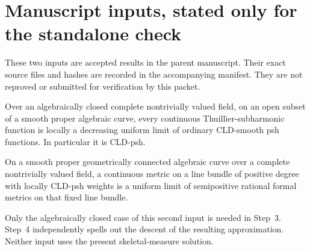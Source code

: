 \section*{Manuscript inputs, stated only for the standalone check}
These two inputs are accepted results in the parent manuscript.  Their
exact source files and hashes are recorded in the accompanying manifest.
They are not reproved or submitted for verification by this packet.

\begin{theorem}
\label{thm:p063-current-psh-ordinary-regularization}
Over an algebraically closed complete nontrivially valued field, on an
open subset of a smooth proper algebraic curve, every continuous
Thuillier-subharmonic function is locally a decreasing uniform limit
of ordinary CLD-smooth psh functions.  In particular it is CLD-psh.
\end{theorem}

\begin{theorem}
\label{thm:p081-corrected-curve-comparison}
On a smooth proper geometrically connected algebraic curve over a
complete nontrivially valued field, a continuous metric on a line bundle
of positive degree with locally CLD-psh weights is a uniform limit of
semipositive rational formal metrics on that fixed line bundle.
\end{theorem}

Only the algebraically closed case of this second input is needed
in Step~3.  Step~4 independently spells out the descent of the resulting
approximation.  Neither input uses the present skeletal-measure solution.
